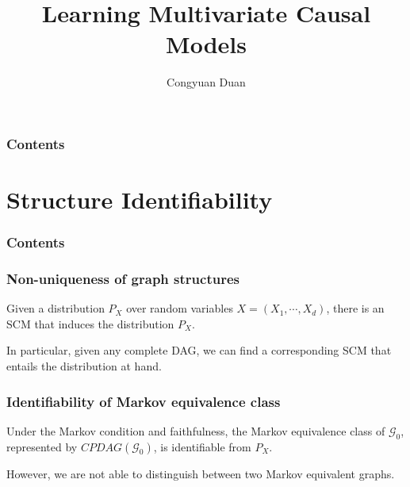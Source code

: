 \documentclass{beamer}
\title{Learning Multivariate Causal Models}
\author{Congyuan Duan}
\begin{document}
\frame{\titlepage}

\begin{frame}
    \frametitle{Contents}
    \tableofcontents
\end{frame}

\section{Structure Identifiability}

\begin{frame}
    \frametitle{Contents}
    \tableofcontents[currentsection]
\end{frame}

\begin{frame}
    \frametitle{Non-uniqueness of graph structures}
    \begin{flushleft}
        Given a distribution $P_X$ over random variables $X=(X_1,\cdots,X_d)$, there is an SCM
        that induces the distribution $P_X$.  
    \end{flushleft} 
    \begin{flushleft}
        In particular, given any complete DAG, we can find a corresponding SCM that
        entails the distribution at hand.
    \end{flushleft}
\end{frame}

\begin{frame}
    \frametitle{Identifiability of Markov equivalence class}
    \begin{flushleft}
        Under the Markov condition and faithfulness, the Markov equivalence class of $\mathcal{G}_0$, 
        represented by $CPDAG(\mathcal{G}_0)$, is identifiable from $P_X$. 
    \end{flushleft} 
    \begin{flushleft}
        However, we are not able to distinguish between two Markov equivalent graphs.
    \end{flushleft}
\end{frame}
\end{document}
